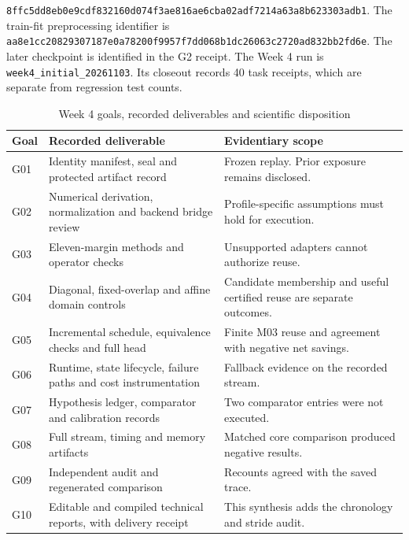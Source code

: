 \documentclass[journal]{IEEEtran}
\newcommand{\code}[1]{\nolinkurl{#1}}
\begin{document}
\code{8ffc5dd8eb0e9cdf832160d074f3ae816ae6cba02adf7214a63a8b623303adb1}.
The train-fit preprocessing identifier is
\code{aa8e1cc20829307187e0a78200f9957f7dd068b1dc26063c2720ad832bb2fd6e}.
The later checkpoint is identified in the G2 receipt. The Week 4 run is \code{week4_initial_20261103}. Its closeout records 40 task receipts, which are separate from regression test counts.
\begin{table}[H]
\caption{Week 4 goals, recorded deliverables and scientific disposition}
\centering\small
\begin{tabularx}{\textwidth}{@{}lYY@{}}\toprule
Goal & Recorded deliverable & Evidentiary scope\\\midrule
G01 & Identity manifest, seal and protected artifact record & Frozen replay. Prior exposure remains disclosed.\\
G02 & Numerical derivation, normalization and backend bridge review & Profile-specific assumptions must hold for execution.\\
G03 & Eleven-margin methods and operator checks & Unsupported adapters cannot authorize reuse.\\
G04 & Diagonal, fixed-overlap and affine domain controls & Candidate membership and useful certified reuse are separate outcomes.\\
G05 & Incremental schedule, equivalence checks and full head & Finite M03 reuse and agreement with negative net savings.\\
G06 & Runtime, state lifecycle, failure paths and cost instrumentation & Fallback evidence on the recorded stream.\\
G07 & Hypothesis ledger, comparator and calibration records & Two comparator entries were not executed.\\
G08 & Full stream, timing and memory artifacts & Matched core comparison produced negative results.\\
G09 & Independent audit and regenerated comparison & Recounts agreed with the saved trace.\\
G10 & Editable and compiled technical reports, with delivery receipt & This synthesis adds the chronology and stride audit.\\
\bottomrule\end{tabularx}
\end{table}


\clearpage



\end{document}
